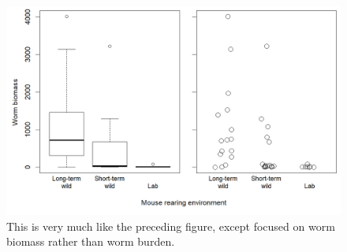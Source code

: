 \documentclass[12pt,reqno,final,pdftex]{amsart}\usepackage[]{graphicx}\usepackage[]{color}
\newenvironment{knitrout}{}{} %
\theoremstyle{plain}
\numberwithin{equation}{part}
\begin{document}
\begin{knitrout}\scriptsize
{}\color{fgcolor}\begin{figure}

\includegraphics[width=\linewidth]{figure/unnamed-chunk-4-1} \hfill{}

\caption[This is very much like the preceding figure, except focused on worm biomass rather than worm burden]{This is very much like the preceding figure, except focused on worm biomass rather than worm burden.}\label{fig:unnamed-chunk-4}
\end{figure}


\end{knitrout}

\newpage
\end{document}
